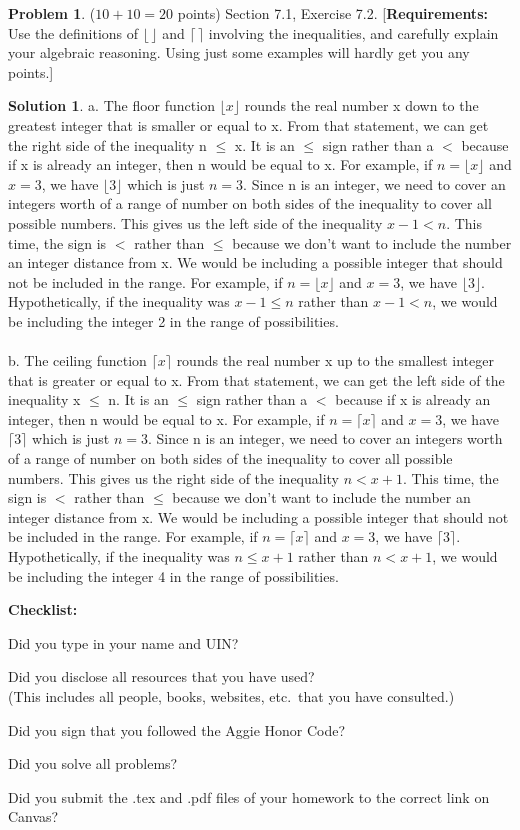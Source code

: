 \documentclass{article}
\theoremstyle{definition}
\newtheorem{problem}{Problem}
\newtheorem*{solution}{Solution}
\newcommand{\checklist}{\noindent\textbf{Checklist:}
\begin{compactitem}[$\Box$] 
\item Did you type in your name and UIN? 
\item Did you disclose all resources that you have used? \\
(This includes all people, books, websites, etc.\ that you have consulted.)
\item Did you sign that you followed the Aggie Honor Code? 
\item Did you solve all problems? 
\item Did you submit the .tex and .pdf files of your homework to the correct link on Canvas? 
\end{compactitem}
}
\begin{document}
\begin{problem} ($10+10=20$ points) Section 7.1, Exercise 7.2.
[\textbf{Requirements:} Use the definitions of $\lfloor \, \rfloor$ and $\lceil \, \rceil$ involving 
the inequalities, and carefully explain your algebraic reasoning. Using just some examples 
will hardly get you any points.]
\end{problem}
\begin{solution}
a. The floor function $\lfloor x \rfloor$ rounds the real number x down to the greatest integer that is smaller or equal to x. From that statement, we can get the right side of the inequality n $\leqslant$ x. It is an $\leqslant$ sign rather than a $<$ because if x is already an integer, then n would be equal to x. For example, if $n = \lfloor x \rfloor$ and $x = 3$, we have $\lfloor 3 \rfloor$ which is just $n = 3$. Since n is an integer, we need to cover an integers worth of a range of number on both sides of the inequality to cover all possible numbers. This gives us the left side of the inequality $x - 1 < n$. This time, the sign is $<$ rather than $\leqslant$ because we don't want to include the number an integer distance from x. We would be including a possible integer that should not be included in the range. For example, if $n = \lfloor x \rfloor$ and $x = 3$, we have $\lfloor 3 \rfloor$. Hypothetically, if the inequality was $x - 1 \leqslant n$ rather than $x - 1 < n$, we would be including the integer 2 in the range of possibilities. \\
\\
b. The ceiling function $\lceil x \rceil$ rounds the real number x up to the smallest integer that is greater or equal to x. From that statement, we can get the left side of the inequality x $\leqslant$ n. It is an $\leqslant$ sign rather than a $<$ because if x is already an integer, then n would be equal to x. For example, if $n = \lceil x \rceil$ and $x = 3$, we have $\lceil 3 \rceil$ which is just $n = 3$. Since n is an integer, we need to cover an integers worth of a range of number on both sides of the inequality to cover all possible numbers. This gives us the right side of the inequality $n < x + 1$. This time, the sign is $<$ rather than $\leqslant$ because we don't want to include the number an integer distance from x. We would be including a possible integer that should not be included in the range. For example, if $n = \lceil x \rceil$ and $x = 3$, we have $\lceil 3 \rceil$. Hypothetically, if the inequality was $n \leqslant x + 1$ rather than $n < x + 1$, we would be including the integer 4 in the range of possibilities. \\
\end{solution}

\goodbreak
\checklist
\end{document}
